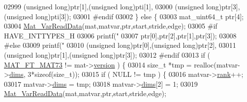 \begin{DoxyCode}
{{{{{{{{{{{{{{{{{{{{{{{{{{{{{{{{02999                             (\textcolor{keywordtype}{unsigned} \textcolor{keywordtype}{long})ptr[1],(\textcolor{keywordtype}{unsigned} \textcolor{keywordtype}{long})pti[1],
03000                             (\textcolor{keywordtype}{unsigned} \textcolor{keywordtype}{long})ptr[3],(\textcolor{keywordtype}{unsigned} \textcolor{keywordtype}{long})pti[3]);
03001 \textcolor{preprocessor}{#endif}
03002                     \} \textcolor{keywordflow}{else} \{
03003                         mat\_uint64\_t ptr[4];
03004                         \hyperlink{group___m_a_t_ga1845000f4fc6252ec5ff11c4b9f0759f}{Mat\_VarReadData}(mat,matvar,ptr,start,stride,edge);
03005 \textcolor{preprocessor}{#if HAVE\_INTTYPES\_H}
03006                         printf(\textcolor{stringliteral}{"%
03007                             ptr[0],ptr[2],ptr[1],ptr[3]);
03008 \textcolor{preprocessor}{#else}
03009                         printf(\textcolor{stringliteral}{"%
03010                             (\textcolor{keywordtype}{unsigned} \textcolor{keywordtype}{long})ptr[0],(\textcolor{keywordtype}{unsigned} \textcolor{keywordtype}{long})ptr[2],
03011                             (\textcolor{keywordtype}{unsigned} \textcolor{keywordtype}{long})ptr[1],(\textcolor{keywordtype}{unsigned} \textcolor{keywordtype}{long})ptr[3]);
03012 \textcolor{preprocessor}{#endif}
03013                         \textcolor{keywordflow}{if} ( \hyperlink{group___m_a_t_ggad03442b8378999189d510e3745c702b7a765c5d1d5038947646260dc82483517e}{MAT\_FT\_MAT73} != mat->\hyperlink{struct__mat__t_a729c2bc0afc97485057a5af425635b1a}{version} ) \{
03014                             \textcolor{keywordtype}{size\_t} *tmp = realloc(matvar->\hyperlink{group___m_a_t_a8e01234e1c862ce3472bb37f5a09b92c}{dims}, 3*\textcolor{keyword}{sizeof}(\textcolor{keywordtype}{size\_t}));
03015                             \textcolor{keywordflow}{if} ( NULL != tmp ) \{
03016                                 matvar->\hyperlink{group___m_a_t_a84ba70c96ded13cc555fa75b768d9921}{rank}++;
03017                                 matvar->\hyperlink{group___m_a_t_a8e01234e1c862ce3472bb37f5a09b92c}{dims} = tmp;
03018                                 matvar->\hyperlink{group___m_a_t_a8e01234e1c862ce3472bb37f5a09b92c}{dims}[2] = 1;
03019                                 \hyperlink{group___m_a_t_ga1845000f4fc6252ec5ff11c4b9f0759f}{Mat\_VarReadData}(mat,matvar,ptr,start,stride,edge);
}}}}}}}}}}}}}}}}}}}}}}}}}}}}}}}}}}
\end{DoxyCode}
